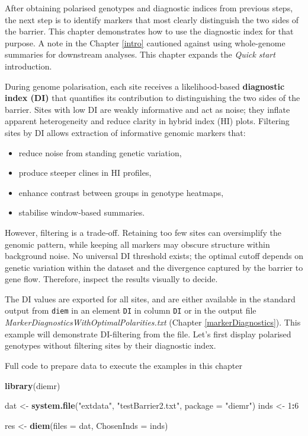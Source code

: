 \documentclass[
]{book}
\newenvironment{Shaded}{\begin{snugshade}}{\end{snugshade}}
\newcommand{\AttributeTok}[1]{\textcolor[rgb]{0.13,0.29,0.53}{#1}}
\newcommand{\DecValTok}[1]{\textcolor[rgb]{0.00,0.00,0.81}{#1}}
\newcommand{\FunctionTok}[1]{\textcolor[rgb]{0.13,0.29,0.53}{\textbf{#1}}}
\newcommand{\NormalTok}[1]{#1}
\newcommand{\OtherTok}[1]{\textcolor[rgb]{0.56,0.35,0.01}{#1}}
\newcommand{\SpecialCharTok}[1]{\textcolor[rgb]{0.81,0.36,0.00}{\textbf{#1}}}
\newcommand{\StringTok}[1]{\textcolor[rgb]{0.31,0.60,0.02}{#1}}
\providecommand{\tightlist}{%
  \setlength{\itemsep}{0pt}\setlength{\parskip}{0pt}}
\begin{document}
After obtaining polarised genotypes and diagnostic indices from previous steps, the next step is to identify markers that most clearly distinguish the two sides of the barrier. This chapter demonstrates how to use the diagnostic index for that purpose. A note in the Chapter \ref{intro} cautioned against using whole-genome summaries for downstream analyses. This chapter expands the \emph{Quick start} introduction.

During genome polarisation, each site receives a likelihood-based \textbf{diagnostic index (DI)} that quantifies its contribution to distinguishing the two sides of the barrier. Sites with low DI are weakly informative and act as noise; they inflate apparent heterogeneity and reduce clarity in hybrid index (HI) plots. Filtering sites by DI allows extraction of informative genomic markers that:

\begin{itemize}
\tightlist
\item
  reduce noise from standing genetic variation,
\item
  produce steeper clines in HI profiles,
\item
  enhance contrast between groups in genotype heatmaps,
\item
  stabilise window‑based summaries.
\end{itemize}

However, filtering is a trade‑off. Retaining too few sites can oversimplify the genomic pattern, while keeping all markers may obscure structure within background noise. No universal DI threshold exists; the optimal cutoff depends on genetic variation within the dataset and the divergence captured by the barrier to gene flow. Therefore, inspect the results visually to decide.

The DI values are exported for all sites, and are either available in the standard output from \texttt{diem} in an element \texttt{DI} in column \texttt{DI} or in the output file \emph{MarkerDiagnosticsWithOptimalPolarities.txt} (Chapter \ref{markerDiagnostics}). This example will demonstrate DI-filtering from the file. Let's first display polarised genotypes without filtering sites by their diagnostic index.

Full code to prepare data to execute the examples in this chapter

\begin{Shaded}
\begin{Highlighting}[]
\FunctionTok{library}\NormalTok{(diemr)}

\NormalTok{dat }\OtherTok{\textless{}{-}} \FunctionTok{system.file}\NormalTok{(}\StringTok{"extdata"}\NormalTok{, }\StringTok{"testBarrier2.txt"}\NormalTok{, }\AttributeTok{package =} \StringTok{"diemr"}\NormalTok{)}
\NormalTok{inds }\OtherTok{\textless{}{-}} \DecValTok{1}\SpecialCharTok{:}\DecValTok{6}

\NormalTok{res }\OtherTok{\textless{}{-}} \FunctionTok{diem}\NormalTok{(}\AttributeTok{files =}\NormalTok{ dat, }\AttributeTok{ChosenInds =}\NormalTok{ inds)}
\end{Highlighting}
\end{Shaded}
\end{document}
